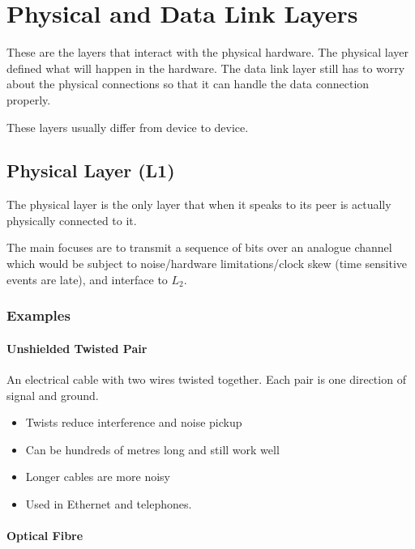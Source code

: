 \section{Physical and Data Link Layers}\label{sec:physical_and_data_link_layers}

These are the layers that interact with the physical hardware.
The physical layer defined what will happen in the hardware.
The data link layer still has to worry about the physical connections so that it can handle the data connection properly.

\begin{note}
	These layers usually differ from device to device.
\end{note}

\subsection{Physical Layer (L1)}\label{sub:physical_layer_or_mkl1_}

The physical layer is the only layer that when it speaks to its peer is actually physically connected to it.

The main focuses are to transmit a sequence of bits over an analogue channel which would be subject to noise/hardware limitations/clock skew (time sensitive events are late), and interface to \(L_2\).

\subsubsection{Examples}\label{ssub:examples_}

\paragraph{Unshielded Twisted Pair}\label{par:unshielded_twisted_pair}

An electrical cable with two wires twisted together.
Each pair is one direction of signal and ground.
\begin{itemize}
	\item Twists reduce interference and noise pickup
	\item Can be hundreds of metres long and still work well
	\item Longer cables are more noisy
	\item Used in Ethernet and telephones.
\end{itemize}

\paragraph{Optical Fibre}\label{par:optical_fibre}

